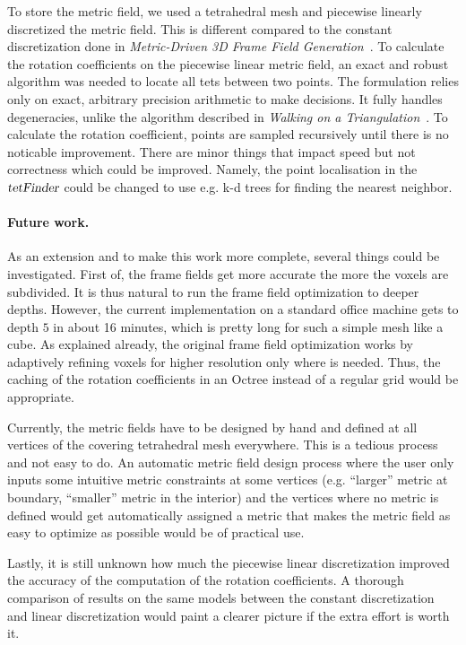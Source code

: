 \documentclass[a4paper,twoside,openright,11pt]{report}
\newcommand{\op}[1]{\textsl{#1}}
\begin{document}
To store the metric field, we used a tetrahedral mesh and piecewise
linearly discretized the metric field. This is different compared
to the constant discretization done in \emph{Metric-Driven 3D Frame Field Generation}~\cite{Fang23}.
To calculate the rotation coefficients on the piecewise linear metric field,
an exact and robust algorithm was needed to locate all tets between two points.
The formulation relies only on exact, arbitrary precision arithmetic to make decisions.
It fully handles degeneracies, unlike the algorithm described in \emph{Walking on a Triangulation}~\cite{Devillers}.
To calculate the rotation coefficient, points are sampled recursively
until there is no noticable improvement.
There are minor things that impact speed but not
correctness which could be improved. Namely, the point localisation
in the $\op{tetFinder}$ could be changed to use e.g. k-d trees for
finding the nearest neighbor.


\paragraph{Future work.}
As an extension and to make this work more complete, several things
could be investigated.
First of, the frame fields get more accurate the more the voxels are
subdivided. It is thus natural to run the frame field optimization to
deeper depths. However, the current implementation on a standard office machine gets to depth $5$ in about 16 minutes,
which is pretty long for such a simple mesh like a cube.
As explained already, the original frame field optimization works by
adaptively refining voxels for higher resolution only where is needed.
Thus, the caching of the rotation coefficients in an Octree instead of 
a regular grid would be appropriate.

Currently, the metric fields have to be designed by hand and defined at
all vertices of the covering tetrahedral mesh everywhere.
This is a tedious process and not easy to do.
An automatic metric field design process where the user only inputs some
intuitive metric constraints at some vertices (e.g. ``larger'' metric at boundary, ``smaller'' metric
in the interior) and the vertices where no metric is defined would get
automatically assigned a metric that makes the metric field as easy to
optimize as possible would be of practical use.

Lastly, it is still unknown how much the piecewise linear
discretization improved the accuracy of the computation of the rotation
coefficients.
A thorough comparison of results on the same models between the
constant discretization~\cite{Fang23}
and linear discretization would paint a clearer picture if the extra
effort is worth it. 
\end{document}

